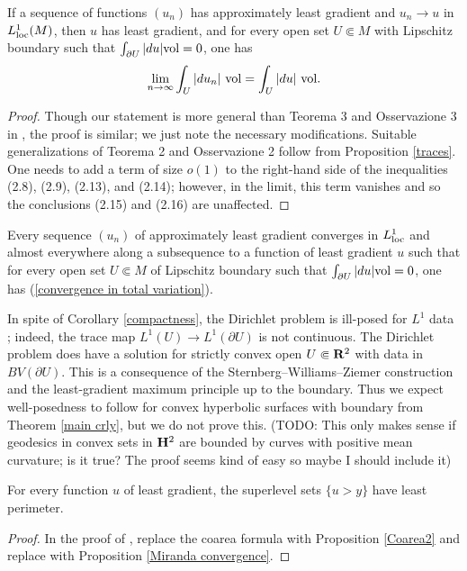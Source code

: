 \begin{proposition}\label{Miranda convergence}
If a sequence of functions $(u_n)$ has approximately least gradient and $u_n \to u$ in $L^1_{\mathrm{loc}}(M)$, then $u$ has least gradient, and for every open set $U \Subset M$ with Lipschitz boundary such that $\int_{\partial U} |du|\mathrm{vol} = 0$, one has 
\begin{equation}\label{convergence in total variation}
\lim_{n \to \infty} \int_U |du_n|~\mathrm{vol} = \int_U |du| ~\mathrm{vol}.
\end{equation}
\end{proposition}
\begin{proof}
Though our statement is more general than Teorema 3 and Osservazione 3 in \cite{Miranda67}, the proof is similar; we just note the necessary modifications.
Suitable generalizations of Teorema 2 and Osservazione 2 follow from Proposition \ref{traces}.
One needs to add a term of size $o(1)$ to the right-hand side of the inequalities (2.8), (2.9), (2.13), and (2.14); however, in the limit, this term vanishes and so the conclusions (2.15) and (2.16) are unaffected.
\end{proof}

\begin{corollary}\label{compactness}
Every sequence $(u_n)$ of approximately least gradient converges in $L^1_{\mathrm{loc}}$ and almost everywhere along a subsequence to a function of least gradient $u$ such that for every open set $U \Subset M$ of Lipschitz boundary such that $\int_{\partial U} |du|\mathrm{vol} = 0$, one has (\ref{convergence in total variation}).
\end{corollary}

In spite of Corollary \ref{compactness}, the Dirichlet problem is ill-posed for $L^1$ data \cite{spradlin2013traces}; indeed, the trace map $L^1(U) \to L^1(\partial U)$ is not continuous.
The Dirichlet problem does have a solution \cite[Theorem 1.1]{górny2017planar} for strictly convex open $U \Subset \mathbf{R}^2$ with data in $BV(\partial U)$.
This is a consequence of the Sternberg--Williams--Ziemer construction \cite{Ziemer1992} and the least-gradient maximum principle up to the boundary.
Thus we expect well-posedness to follow for convex hyperbolic surfaces with boundary from Theorem \ref{main crly}, but we do not prove this.
(TODO: This only makes sense if geodesics in convex sets in $\mathbf H^2$ are bounded by curves with positive mean curvature; is it true? The proof seems kind of easy so maybe I should include it)

\begin{proposition}\label{level sets are minimal}
For every function $u$ of least gradient, the superlevel sets $\{u > y\}$ have least perimeter.
\end{proposition}
\begin{proof}
In the proof of \cite[Theorem 1]{BOMBIERI1969}, replace the coarea formula \cite[Theorem 1.6]{Miranda66} with Proposition \ref{Coarea2} and replace \cite[Teorema 3]{Miranda67} with Proposition \ref{Miranda convergence}.
\end{proof}

